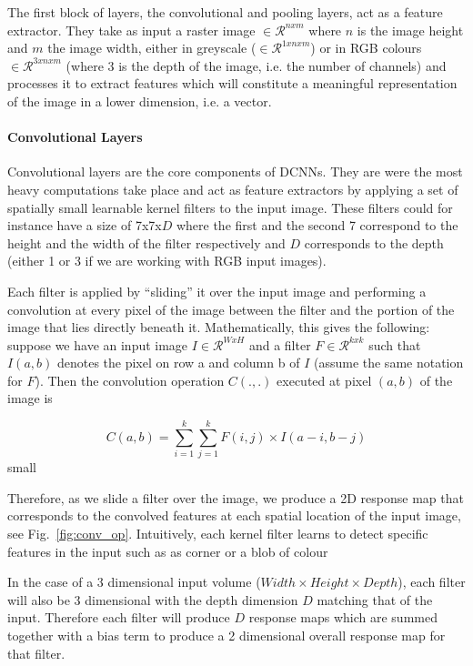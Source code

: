 \documentclass[12pt,twoside]{article}
\begin{document}
The first block of layers, the convolutional and pooling layers, act as a feature
extractor. They take as input a raster image $\in \mathcal{R}^{nxm}$ where 
$n$ is the image height and $m$ the image width, either in greyscale ($\in
\mathcal{R}^{1xnxm}$) or in RGB colours $\in \mathcal{R}^{3xnxm}$ 
(where 3 is the depth of the image, i.e. the number of channels) and
processes it to extract features which will constitute a meaningful
representation of the image in a lower dimension, i.e. a vector.

\paragraph{Convolutional Layers}

Convolutional layers are the core components of DCNNs. They are were the most
heavy computations take place and act as feature extractors by applying a set
of spatially small learnable kernel filters to the input image. 
These filters could  for instance have a
size of 7x7x$D$ where the first and the second 7 correspond to the height and the
width of the filter respectively and $D$ corresponds to the depth (either 1 or 3
if we are working with RGB input images).

Each filter is applied by ``sliding'' it over the input image and performing a
convolution at every pixel of the image between the filter and the portion of 
the image that lies directly beneath it. Mathematically, this gives the
following: suppose we have an input image $I \in \mathcal{R}^{WxH}$ and a
filter $F \in \mathcal{R}^{kxk}$ such that $I(a,b)$ denotes the pixel on row
a and column b of $I$ (assume the same notation for $F$). Then the convolution
operation  $C(.,.)$ executed at pixel $(a,b)$ of the image is

\begin{equation}
  C(a,b) = \sum_{i=1}^{k}\sum_{j=1}^{k} F(i,j) \times I(a-i, b-j)
  \label{eq:convolution}
\end{equation}small

Therefore, as we slide a filter over the image, we produce a 2D response map
that corresponds to the convolved features at each spatial location of the
input image, see Fig.~\ref{fig:conv_op}. Intuitively, each kernel filter learns
to detect specific features in the input such as as corner or a blob of colour

In the case of a 3 dimensional input volume ($Width \times Height \times Depth$), each filter will also be 3
dimensional with the depth dimension $D$ matching that of the input. Therefore each
filter will produce $D$ response maps which are summed together with a bias
term to produce a 2 dimensional overall response map for that filter.
\end{document}
